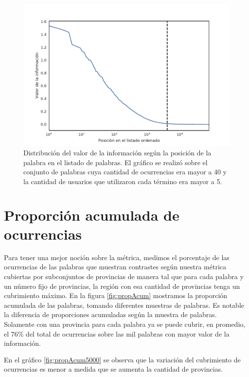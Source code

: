 \begin{figure}[!ht]
\centering
\includegraphics[width=1\textwidth]{./images/train/conFiltro/valorInformacionCorte.pdf}
\caption{Distribución del valor de la información según la posición de la palabra en el listado de palabras. El gráfico se realizó sobre el conjunto de palabras cuya cantidad de ocurrencias era mayor a 40 y la cantidad de usuarios que utilizaron cada término era mayor a 5. } 
\label{fig:ivalue}
\end{figure}


\section{Proporción acumulada de ocurrencias} %
\label{proporcionDeOcurrencias}

Para tener una mejor noción sobre la métrica, medimos el porcentaje de las ocurrencias de las palabras que muestran contrastes según nuestra métrica cubiertas por subconjuntos de provincias de manera tal que para cada palabra y un número fijo de provincias, la región con esa cantidad de provincias tenga un cubrimiento máximo. 
En la figura \ref{fig:propAcum} mostramos la proporción acumulada de las palabras, tomando diferentes muestras de palabras. Es notable la diferencia de proporciones acumuladas según la muestra de palabras. Solamente con una provincia para cada palabra ya se puede cubrir, en promedio, el 76\% del total de ocurrencias sobre las mil palabras con mayor valor de la información.

En el gráfico \ref{fig:propAcum5000} se observa que la variación del cubrimiento de ocurrencias es menor a medida que se aumenta la cantidad de provincias. 


